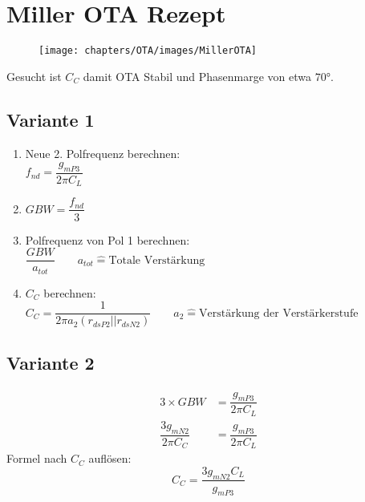 \section{Miller OTA Rezept}

\begin{figure}[h]
\texttt{[image: chapters/OTA/images/MillerOTA]}
\end{figure}

Gesucht ist $C_C$ damit OTA Stabil und Phasenmarge von etwa $70°$.

\subsection{Variante 1}
\begin{enumerate}
    \item Neue 2. Polfrequenz berechnen:\\[4pt]
        $ f_{nd} = \dfrac{g_{mP3}}{2\pi C_L} $
    \item $ GBW = \dfrac{f_{nd}}{3} $
    \item Polfrequenz von Pol 1 berechnen:\\[4pt]
        $ \dfrac{GBW}{a_{tot}} \qquad a_{tot} \widehat{=} \text{Totale Verstärkung} $
    \item $C_C$ berechnen:\\[4pt]
        $ C_C = \dfrac{1}{2 \pi a_2 (r_{dsP2} || r_{dsN2})} \qquad a_{2} \widehat{=} \text{Verstärkung der Verstärkerstufe} $
\end{enumerate}

\subsection{Variante 2}
\begin{align*}
    3\times GBW &= \dfrac{g_{m{P3}}}{2\pi C_L}\\
    \dfrac{3 g_{mN2}}{2\pi C_C} &= \dfrac{g_{m{P3}}}{2\pi C_L}
\end{align*}
Formel nach $C_C$ auflösen:
\begin{equation*}
    C_C = \dfrac{3g_{mN2} C_L}{g_{mP3}}
\end{equation*}


